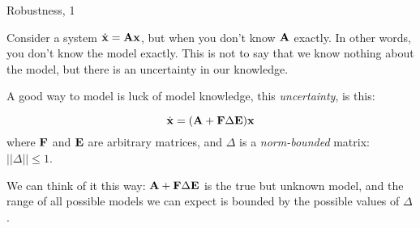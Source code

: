 \documentclass{beamer}
\begin{document}
	
	
	
	\begin{frame}{Robustness, 1}
		\begin{flushleft}
			
			Consider a system $\dot{\mathbf{x}} = \mathbf{A}\mathbf{x}$, but when you don't know $\mathbf{A}$ exactly. In other words, you don't know the model exactly. This is not to say that we know nothing about the model, but there is an uncertainty in our knowledge.
			
			\bigskip
			
			A good way to model is luck of model knowledge, this \emph{uncertainty}, is this:
			
			\begin{equation}
				\label{eq:uncertain}
				\dot{\mathbf{x}} = (\mathbf{A} + \mathbf{F} \Delta \mathbf{E})\mathbf{x}
			\end{equation}
			where $\mathbf{F}$ and $\mathbf{E}$ are arbitrary matrices, and $\Delta$ is a \emph{norm-bounded} matrix: $||\Delta|| \leq 1$.
			
			\bigskip
			
			We can think of it this way: $\mathbf{A} + \mathbf{F} \Delta \mathbf{E}$ is the true but unknown model, and the range of all possible models we can expect is bounded by the possible values of $\Delta$.
			
		\end{flushleft}
	\end{frame}
	
	
	
\end{document}
